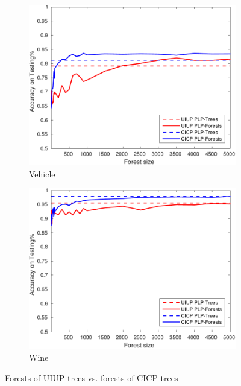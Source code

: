 \begin{figure}[ht]
\begin{subfigure}[b]{0.3\textwidth}
  	\includegraphics[width=\textwidth]{figs/PLPTF/Forests/VehicleDownsampledFurther_Forests_MH.pdf}
  	\caption{Vehicle}
		\label{fig:V4}
	\end{subfigure}
  \begin{subfigure}[b]{0.3\textwidth}
		\centering
  	\includegraphics[width=\textwidth]{figs/PLPTF/Forests/WineDownsampled_Forests_MH.pdf}
  	\caption{Wine}
		\label{fig:W4}
	\end{subfigure}

  \caption{Forests of UIUP trees vs. forests of CICP trees}
  \label{fig:forests2}
\end{figure}



